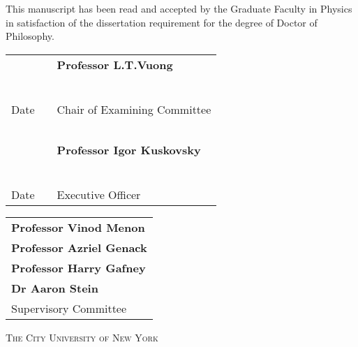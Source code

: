 \begin{center}
This manuscript has been read and accepted by the Graduate Faculty in Physics in satisfaction of the dissertation requirement for the degree of Doctor of Philosophy.
\end{center}

\vspace{0.75in}

\begin{tabular}{p{1.75in}p{0.5in}p{3.5in}}
~                                   & & \textbf{Professor L.T.Vuong}\\
~                                   & & \\
\hrulefill                          & &\hrulefill \\
Date                                & & Chair of Examining Committee\\
~                                   & & \\
~                                   & & \textbf{Professor Igor Kuskovsky}\\
~                                   & & \\
\hrulefill                          & &\hrulefill \\
Date                                & & Executive Officer\\
\end{tabular}

\vspace{0.75in}

\begin{tabular}{l}
\textbf{Professor Vinod Menon} \\
\textbf{Professor Azriel Genack} \\
\textbf{Professor Harry Gafney} \\
\textbf{Dr Aaron Stein} \\
Supervisory Committee \\
\end{tabular}


\vspace{\fill}
\begin{center}
\textsc{The City University of New York}
\end{center}